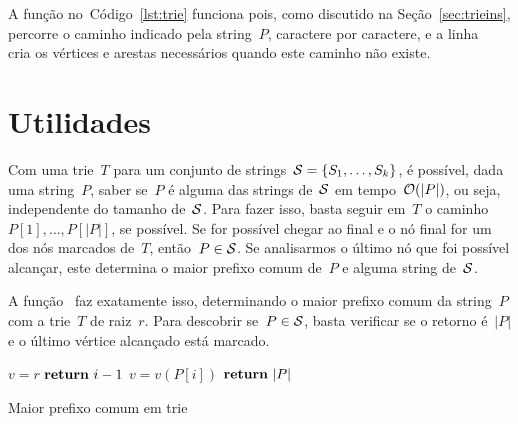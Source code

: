 A função no~Código~\ref{lst:trie} funciona pois, como discutido na Seção~\ref{sec:trieins}, percorre o caminho indicado pela string~$P$, caractere por caractere, e a linha~ cria os vértices e arestas necessários quando este caminho não existe.

\section{Utilidades}

Com uma trie~$T$ para um conjunto de strings~$\mathcal{S} = \{S_1, \ldots, S_k\}$, é possível, dada uma string~$P$, saber se~$P$ é alguma das strings de~$\mathcal{S}$ em tempo~$\mathcal{O}(|P|)$, ou seja, independente do tamanho de~$\mathcal{S}$. Para fazer isso, basta seguir em~$T$ o caminho~$P[1], \dots, P[|P|]$, se possível. Se for possível chegar ao final e o nó final for um dos nós marcados de~$T$, então~${P \in \mathcal{S}}$. Se analisarmos o último nó que foi possível alcançar, este determina o maior prefixo comum de~$P$ e alguma string de~$\mathcal{S}$.

A função~ faz exatamente isso, determinando o maior prefixo comum da string~$P$ com a trie~$T$ de raiz~$r$. Para descobrir se~$P \in \mathcal{S}$, basta verificar se o retorno é~$|P|$ e o último vértice alcançado está marcado.

\begin{algorithm}
\begin{algorithmic}[1]
    \State $v = r$
            \State $\Return\ i - 1$
        \EndIf
        \State $v = v(P[i])$
    \EndFor
    \State $\Return\ |P|$
\EndFunction
\end{algorithmic}
\caption{Maior prefixo comum em trie}
\end{algorithm}